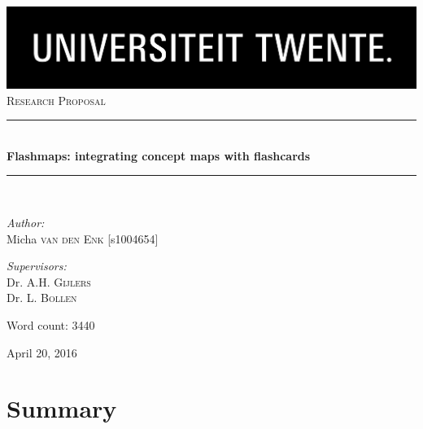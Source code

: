 \documentclass[11pt,twoside]{report} %
\newcommand{\HRule}{\rule{\linewidth}{0.5mm}}
\newcommand\blankpage{%
    \null
    \thispagestyle{empty}%
    \newpage}
\begin{document}
\begin{titlepage}

\begin{center}


\includegraphics[width=1\textwidth]{./logo}\\[1cm]    

\textsc{\Large Research Proposal}\\[0.5cm]

\HRule \\[0.4cm]
{ \huge \bfseries Flashmaps: integrating concept maps with flashcards}\\[0.4cm]

\HRule \\[1.5cm]

\begin{minipage}{0.4\textwidth}
\begin{flushleft} \large
\emph{Author:}\\
Micha \textsc{van den Enk} {[}s1004654{]} \\
\end{flushleft}
\end{minipage}
\begin{minipage}{0.4\textwidth}
\begin{flushright} \large
\emph{Supervisors:} \\
Dr. A.H. \textsc{Gijlers} \\
Dr. L. \textsc{Bollen} \\
\end{flushright}
\end{minipage}

\vfill

Word count: 3440

{\large April 20, 2016}

\end{center}

\end{titlepage}

\afterpage{\blankpage}

\setcounter{tocdepth}{1}
\tableofcontents
\thispagestyle{fancy}
\newpage

\chapter{Summary}
\end{document}
